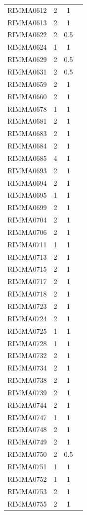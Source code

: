 \documentclass[11pt]{article}
\newcounter{rowno}
\begin{document}
\begin{scriptsize}
\begin{longtable}{>{\stepcounter{rowno}}cccc}
    RIMMA0612 & 2     & 1 \\
    RIMMA0613 & 2     & 1 \\
    RIMMA0622 & 2     & 0.5 \\
    RIMMA0624 & 1     & 1 \\
    RIMMA0629 & 2     & 0.5 \\
    RIMMA0631 & 2     & 0.5 \\
    RIMMA0659 & 2     & 1 \\
    RIMMA0660 & 2     & 1 \\
    RIMMA0678 & 1     & 1 \\
    RIMMA0681 & 2     & 1 \\
    RIMMA0683 & 2     & 1 \\
    RIMMA0684 & 2     & 1 \\
    RIMMA0685 & 4     & 1 \\
    RIMMA0693 & 2     & 1 \\
    RIMMA0694 & 2     & 1 \\
    RIMMA0695 & 1     & 1 \\
    RIMMA0699 & 2     & 1 \\
    RIMMA0704 & 2     & 1 \\
    RIMMA0706 & 2     & 1 \\
    RIMMA0711 & 1     & 1 \\
    RIMMA0713 & 2     & 1 \\
    RIMMA0715 & 2     & 1 \\
    RIMMA0717 & 2     & 1 \\
    RIMMA0718 & 2     & 1 \\
    RIMMA0723 & 2     & 1 \\
    RIMMA0724 & 2     & 1 \\
    RIMMA0725 & 1     & 1 \\
    RIMMA0728 & 1     & 1 \\
    RIMMA0732 & 2     & 1 \\
    RIMMA0734 & 2     & 1 \\
    RIMMA0738 & 2     & 1 \\
    RIMMA0739 & 2     & 1 \\
    RIMMA0744 & 2     & 1 \\
    RIMMA0747 & 1     & 1 \\
    RIMMA0748 & 2     & 1 \\
    RIMMA0749 & 2     & 1 \\
    RIMMA0750 & 2     & 0.5 \\
    RIMMA0751 & 1     & 1 \\
    RIMMA0752 & 1     & 1 \\
    RIMMA0753 & 2     & 1 \\
    RIMMA0755 & 2     & 1 \\
    \hline
\end{longtable}
\end{scriptsize}
\end{document}
